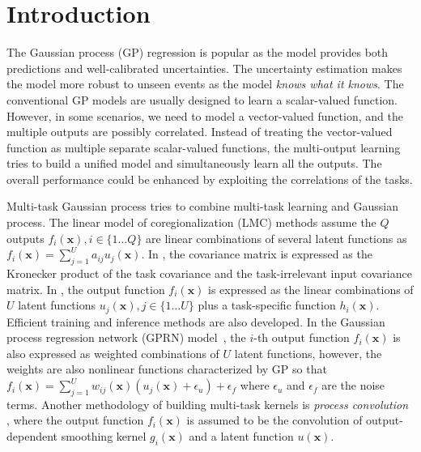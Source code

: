 \section{Introduction}

The Gaussian process (GP) regression is popular as the model provides both predictions and well-calibrated uncertainties. The uncertainty estimation makes the model more robust to unseen events as the model \emph{knows what it knows}. The conventional GP models are usually designed to learn a scalar-valued function. However, in some scenarios, we need to model a vector-valued function, and the multiple outputs are possibly correlated. Instead of treating the vector-valued function as multiple separate scalar-valued functions, the multi-output learning \cite{zhang2017survey} tries to build a unified model and simultaneously learn all the outputs. The overall performance could be enhanced by exploiting the correlations of the tasks.

Multi-task Gaussian process \cite{vectorvaluedkernel} tries to combine multi-task learning and Gaussian process. The linear model of coregionalization (LMC) methods \cite{journel1978mining} assume the $Q$ outputs $f_i(\bm{x}), i \in \{1\dots Q\}$ are linear combinations of several latent functions as $f_i(\bm{x}) = \sum_{j=1}^U a_{ij} u_j(\bm{x})$. In \cite{bonilla2008multi}, the covariance matrix is expressed as the Kronecker product of the task covariance and the task-irrelevant input covariance matrix. In \cite{nguyen2014collaborative}, the output function $f_i(\bm{x})$ is expressed as the linear combinations of $U$ latent functions $u_j(\bm{x}), j \in \{1\dots U\}$ plus a task-specific function $h_i(\bm{x})$. Efficient training and inference methods are also developed. In the Gaussian process regression network (GPRN) model~\cite{wilson2012gaussian}, the $i$-th output function $f_i(\bm{x})$ is also expressed as weighted combinations of $U$ latent functions, however, the weights are also nonlinear functions characterized by GP so that $f_i(\bm{x}) = \sum_{j=1}^U w_{ij}(\bm{x}) (u_j(\bm{x}) + \epsilon_u) + \epsilon_f$ where $\epsilon_u$ and $\epsilon_f$ are the noise terms. Another methodology of building multi-task kernels is \emph{process convolution} \cite{boyle2005dependent,alvarez2009sparse,alvarez2011computationally}, where the output function $f_i(\bm{x})$ is assumed to be the convolution of output-dependent smoothing kernel $g_i(\bm{x})$ and a latent function $u(\bm{x})$.


